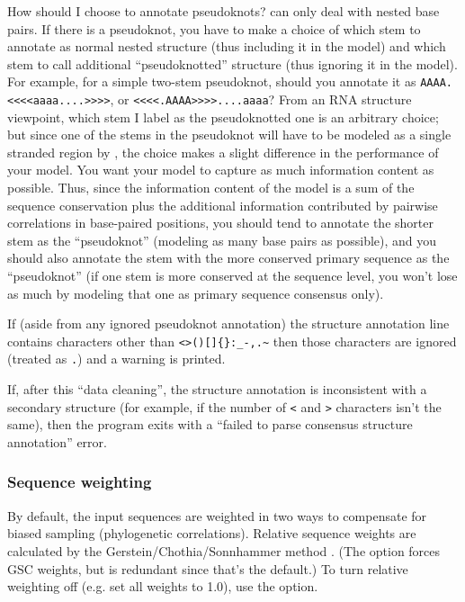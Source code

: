 \begin{srefaq}{How should I choose to annotate pseudoknots?} 
 can only deal with nested base pairs. If there is
a pseudoknot, you have to make a choice of which stem to annotate as
normal nested structure (thus including it in the model) and which
stem to call additional ``pseudoknotted'' structure (thus ignoring it
in the model). For example, for a simple two-stem pseudoknot, should
you annotate it as \verb+AAAA.<<<<aaaa....>>>>+, or
\verb+<<<<.AAAA>>>>....aaaa+?  From an RNA structure viewpoint, which
stem I label as the pseudoknotted one is an arbitrary choice; but
since one of the stems in the pseudoknot will have to be modeled as a
single stranded region by , the choice makes a
slight difference in the performance of your model. You want your
model to capture as much information content as possible.  Thus, since
the information content of the model is a sum of the sequence
conservation plus the additional information contributed by pairwise
correlations in base-paired positions, you should tend to annotate the
shorter stem as the ``pseudoknot'' (modeling as many base pairs as
possible), and you should also annotate the stem with the more
conserved primary sequence as the ``pseudoknot'' (if one stem is more
conserved at the sequence level, you won't lose as much by modeling
that one as primary sequence consensus only).
\end{srefaq}

If (aside from any ignored pseudoknot annotation) the structure
annotation line contains characters other than \verb+<>()[]{}:_-,.~+
then those characters are ignored (treated as \verb+.+) and a warning
is printed.

If, after this ``data cleaning'', the structure annotation is
inconsistent with a secondary structure (for example, if the number of
\verb+<+ and \verb+>+ characters isn't the same), then the program
exits with a ``failed to parse consensus structure annotation'' error.

\subsubsection{Sequence weighting}

By default, the input sequences are weighted in two ways to compensate
for biased sampling (phylogenetic correlations).  Relative sequence
weights are calculated by the Gerstein/Chothia/Sonnhammer method
\cite{Gerstein94}.  (The  option forces GSC weights, but
is redundant since that's the default.)  To turn relative weighting
off (e.g. set all weights to 1.0), use the  option.

